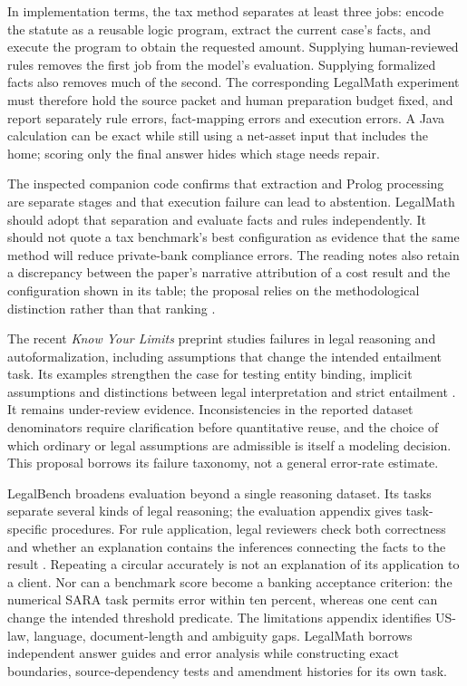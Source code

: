 \documentclass[12pt,a4paper,oneside,openany]{book}
\begin{document}
In implementation terms, the tax method separates at least three jobs: encode
the statute as a reusable logic program, extract the current case's facts, and
execute the program to obtain the requested amount. Supplying human-reviewed
rules removes the first job from the model's evaluation. Supplying formalized
facts also removes much of the second. The corresponding LegalMath experiment
must therefore hold the source packet and human preparation budget fixed, and
report separately rule errors, fact-mapping errors and execution errors. A Java
calculation can be exact while still using a net-asset input that includes the
home; scoring only the final answer hides which stage needs repair.

The inspected companion code confirms that extraction and Prolog processing are
separate stages and that execution failure can lead to abstention. LegalMath
should adopt that separation and evaluate facts and rules independently. It
should not quote a tax benchmark's best configuration as evidence that the same
method will reduce private-bank compliance errors. The reading notes also retain
a discrepancy between the paper's narrative attribution of a cost result and
the configuration shown in its table; the proposal relies on the methodological
distinction rather than that ranking \citep{libraryreview}.

The recent \emph{Know Your Limits} preprint studies failures in legal reasoning
and autoformalization, including assumptions that change the intended entailment
task. Its examples strengthen the case for testing entity binding, implicit
assumptions and distinctions between legal interpretation and strict entailment
\citep[secs.~3--5]{limits2026}. It remains under-review evidence. Inconsistencies
in the reported dataset denominators require clarification before quantitative
reuse, and the choice of which ordinary or legal assumptions are admissible is
itself a modeling decision. This proposal borrows its failure taxonomy, not a
general error-rate estimate.

LegalBench broadens evaluation beyond a single reasoning dataset. Its tasks
separate several kinds of legal reasoning; the evaluation appendix gives
task-specific procedures. For rule application, legal reviewers check both
correctness and whether an explanation contains the inferences connecting the
facts to the result \citep[sec.~3 and evaluation appendix]{legalbench2023}.
Repeating a circular accurately is not an explanation of its application to a
client. Nor can a benchmark score become a banking acceptance criterion: the
numerical SARA task permits error within ten percent, whereas one cent can change
the intended threshold predicate. The limitations appendix identifies US-law,
language, document-length and ambiguity gaps. LegalMath borrows independent
answer guides and error analysis while constructing exact boundaries,
source-dependency tests and amendment histories for its own task.
\end{document}
